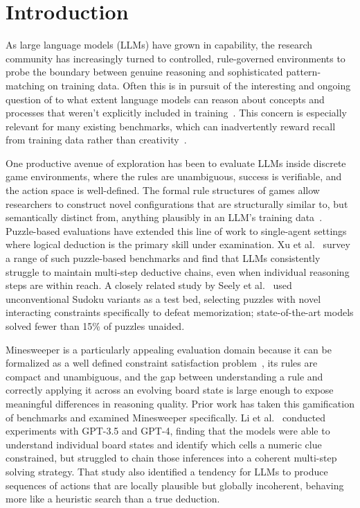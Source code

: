 \documentclass[11pt,conference,compsoc]{IEEEtran}
\begin{document}
\section{Introduction}

As large language models (LLMs) have grown in capability, the research community has increasingly turned to controlled, rule-governed environments to probe the boundary between genuine reasoning and sophisticated pattern-matching on training data. Often this is in pursuit of the interesting and ongoing question of to what extent language models can reason about concepts and processes that weren't explicitly included in training~\cite{brown2020gpt3,wei2022emergent}. This concern is especially relevant for many existing benchmarks, which can inadvertently reward recall from training data rather than creativity~\cite{li2024minesweeper}.

One productive avenue of exploration has been to evaluate LLMs inside discrete game environments, where the rules are unambiguous, success is verifiable, and the action space is well-defined. The formal rule structures of games allow researchers to construct novel configurations that are structurally similar to, but semantically distinct from, anything plausibly in an LLM's training data~\cite{liu2023agentbench,hu2025gamearena,seely2025sudoku}. Puzzle-based evaluations have extended this line of work to single-agent settings where logical deduction is the primary skill under examination. Xu et al.~\cite{xu2024puzzlesurvey} survey a range of such puzzle-based benchmarks and find that LLMs consistently struggle to maintain multi-step deductive chains, even when individual reasoning steps are within reach. A closely related study by Seely et al.~\cite{seely2025sudoku} used unconventional Sudoku variants as a test bed, selecting puzzles with novel interacting constraints specifically to defeat memorization; state-of-the-art models solved fewer than 15\% of puzzles unaided.

Minesweeper is a particularly appealing evaluation domain because it can be formalized as a well defined constraint satisfaction problem~\cite{studholme2001minesweeper}, its rules are compact and unambiguous, and the gap between understanding a rule and correctly applying it across an evolving board state is large enough to expose meaningful differences in reasoning quality. Prior work has taken this gamification of benchmarks and examined Minesweeper specifically. Li et al.~\cite{li2024minesweeper} conducted experiments with GPT-3.5 and GPT-4, finding that the models were able to understand individual board states and identify which cells a numeric clue constrained, but struggled to chain those inferences into a coherent multi-step solving strategy. That study also identified a tendency for LLMs to produce sequences of actions that are locally plausible but globally incoherent, behaving more like a heuristic search than a true deduction.
\end{document}
